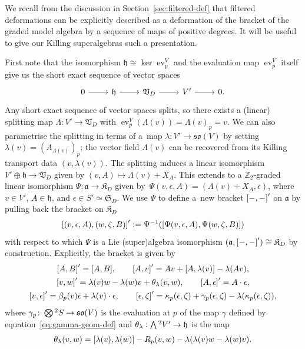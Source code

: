 \documentclass[11pt]{article}
\numberwithin{equation}{section}
\numberwithin{equation}{section}
\newcommand{\fa}{\mathfrak{a}}
\newcommand{\fh}{\mathfrak{h}}
\newcommand{\fso}{\mathfrak{so}}
\newcommand{\fK}{\mathfrak{K}}
\newcommand{\fS}{\mathfrak{S}}
\newcommand{\fV}{\mathfrak{V}}
\newcommand{\ZZ}{\mathbb{Z}}
\newcommand{\Wedge}{\mathchoice{{\textstyle\bigwedge}}{\bigwedge}{\bigwedge}{\bigwedge}}	%
\newcommand{\Otimes}{\mathchoice{{\textstyle\bigotimes}}{\bigotimes}{\bigotimes}{\bigotimes}}
\newcommand{\1}{\mathbbm{1}}
\DeclareMathOperator{\evaluate}{ev}
\begin{document}
We recall from the discussion in Section~\ref{sec:filtered-def} that filtered deformations can be explicitly described as a deformation of the bracket of the graded model algebra by a sequence of maps of positive degrees. It will be useful to give our Killing superalgebras such a presentation.

First note that the isomorphism $\fh\cong\ker\evaluate^V_p$ and the evaluation map $\evaluate^V_p$ itself give us the short exact sequence of vector spaces
\[
\begin{tikzcd}
	0 \ar[r] & \fh \ar[r] & \fV_D \ar[r] & V' \ar[r] & 0.
\end{tikzcd}
\]
Any short exact sequence of vector spaces splits, so there exists a (linear) splitting map $\Lambda\colon V'\to \fV_D$ with $\evaluate^V_p(\Lambda(v))=\Lambda(v)_p=v$. We can also parametrise the splitting in terms of a~map $\lambda\colon V'\to \fso(V)$ by setting $\lambda(v)=(A_{\Lambda(v)})_p$; the vector field $\Lambda(v)$ can be recovered from its Killing transport data $(v,\lambda(v))$. The splitting induces a linear isomorphism $V'\oplus\fh\to\fV_D$ given by $(v,A)\mapsto \Lambda(v)+X_A$.
This extends to a $\ZZ_2$-graded linear isomorphism $\Psi\colon \fa \to \fK_D$ given by~${\Psi(v,\epsilon,A) = (\Lambda(v)+X_A,\epsilon)}$,
where $v\in V'$, $A\in\fh$, and $\epsilon\in S'\simeq\fS_D$.
We use $\Psi$ to define a~new bracket $\comm{-}{-}'$ on $\fa$ by pulling back the bracket on $\fK_D$
\[
	\comm{(v,\epsilon,A)}{(w,\zeta,B)}'
		:= \Psi^{-1}(\comm{\Psi(v,\epsilon,A)}{\Psi(w,\zeta,B)})
\]
with respect to which $\Psi$ is a Lie (super)algebra isomorphism $(\fa,\comm{-}{-}')\cong\fK_D$ by construction. Explicitly, the bracket is given by
\begin{gather}
	\comm{A}{B}' = \comm{A}{B},\qquad
	 \comm{A}{v}' = Av + \comm{A}{\lambda(v)}-\lambda(Av),\nonumber	\\
	\comm{v}{w}' = \lambda(v)w-\lambda(w)v + \theta_\lambda(v,w),\qquad
	\comm{A}{\epsilon}' = A\cdot\epsilon,\nonumber	\\
	 \comm{v}{\epsilon}' = \beta_p(v)\epsilon + \lambda(v)\cdot \epsilon,	\qquad
	\comm{\epsilon}{\zeta}'
		 = \kappa_p(\epsilon,\zeta) + \gamma_p(\epsilon,\zeta)-\lambda\qty(\kappa_p(\epsilon,\zeta)),\label{eq:KSA-deformed-brackets}
\end{gather}
where $\gamma_p\colon\Otimes^2S\to\fso(V)$ is the evaluation at $p$ of the map $\gamma$ defined by equation~\eqref{eq:gamma-geom-def} and $\theta_\lambda:\Wedge^2V'\to \fh$ is the map
\[
	\theta_\lambda(v,w)
		= \comm{\lambda(v)}{\lambda(w)} - R_p(v,w) - \lambda(\lambda(v)w-\lambda(w)v).
\]
\end{document}
